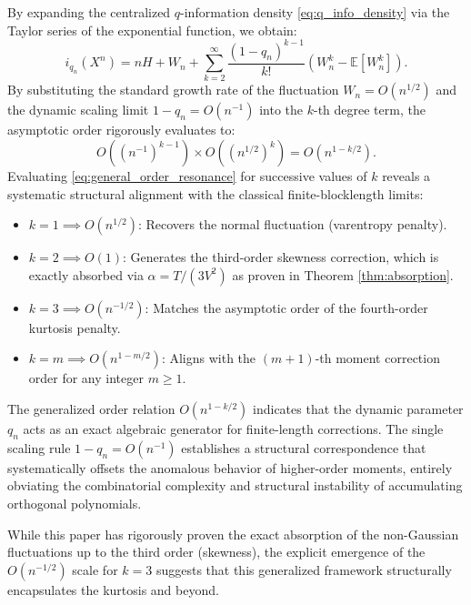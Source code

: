 \documentclass[conference]{IEEEtran}
\begin{document}
\begin{IEEEproof}
By expanding the centralized $q$-information density \eqref{eq:q_info_density} via the Taylor series of the exponential function, we obtain:
\begin{equation}
    i_{q_n}(X^n) = nH + W_n + \sum_{k=2}^{\infty} \frac{(1-q_n)^{k-1}}{k!} \left( W_n^k - \mathbb{E}[W_n^k] \right).
    \label{eq:general_higher_order_expansion}
\end{equation}
By substituting the standard growth rate of the fluctuation $W_n = O(n^{1/2})$ and the dynamic scaling limit $1-q_n = O(n^{-1})$ into the $k$-th degree term, the asymptotic order rigorously evaluates to:
\begin{equation}
    O\left( (n^{-1})^{k-1} \right) \times O\left( (n^{1/2})^k \right) = O\left( n^{1-k/2} \right).
    \label{eq:general_order_resonance}
\end{equation}
Evaluating \eqref{eq:general_order_resonance} for successive values of $k$ reveals a systematic structural alignment with the classical finite-blocklength limits:
\begin{itemize}
    \item $k=1 \implies O(n^{1/2})$: Recovers the normal fluctuation (varentropy penalty).
    \item $k=2 \implies O(1)$: Generates the third-order skewness correction, which is exactly absorbed via $\alpha = T/(3V^2)$ as proven in Theorem \ref{thm:absorption}.
    \item $k=3 \implies O(n^{-1/2})$: Matches the asymptotic order of the fourth-order kurtosis penalty.
    \item $k=m \implies O(n^{1-m/2})$: Aligns with the $(m+1)$-th moment correction order for any integer $m \ge 1$.
\end{itemize}
\end{IEEEproof}

The generalized order relation $O(n^{1-k/2})$ indicates that the dynamic parameter $q_n$ acts as an exact algebraic generator for finite-length corrections. The single scaling rule $1-q_n = O(n^{-1})$ establishes a structural correspondence that systematically offsets the anomalous behavior of higher-order moments, entirely obviating the combinatorial complexity and structural instability of accumulating orthogonal polynomials.

While this paper has rigorously proven the exact absorption of the non-Gaussian fluctuations up to the third order (skewness), the explicit emergence of the $O(n^{-1/2})$ scale for $k=3$ suggests that this generalized framework structurally encapsulates the kurtosis and beyond. 
\end{document}

